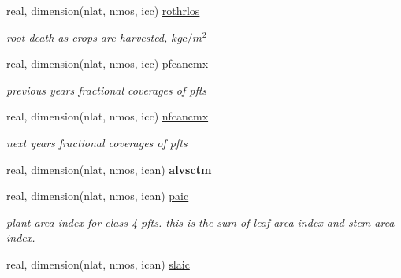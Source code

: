 \begin{DoxyCompactItemize}
\item 
\hypertarget{structctem__statevars_1_1veg__rot_a9b507da454ff945f8594997d5e55495f}{}real, dimension(nlat, nmos, icc) \hyperlink{structctem__statevars_1_1veg__rot_a9b507da454ff945f8594997d5e55495f}{rothrlos}\label{structctem__statevars_1_1veg__rot_a9b507da454ff945f8594997d5e55495f}

\begin{DoxyCompactList}\small\item\em root death as crops are harvested, $kg c/m^2$ \end{DoxyCompactList}\item 
\hypertarget{structctem__statevars_1_1veg__rot_a8f2b20847568aa585a33c3fa1631f12a}{}real, dimension(nlat, nmos, icc) \hyperlink{structctem__statevars_1_1veg__rot_a8f2b20847568aa585a33c3fa1631f12a}{pfcancmx}\label{structctem__statevars_1_1veg__rot_a8f2b20847568aa585a33c3fa1631f12a}

\begin{DoxyCompactList}\small\item\em previous year\textquotesingle{}s fractional coverages of pfts \end{DoxyCompactList}\item 
\hypertarget{structctem__statevars_1_1veg__rot_a3ab103512cda1576ebeb76a3e0d1d6d0}{}real, dimension(nlat, nmos, icc) \hyperlink{structctem__statevars_1_1veg__rot_a3ab103512cda1576ebeb76a3e0d1d6d0}{nfcancmx}\label{structctem__statevars_1_1veg__rot_a3ab103512cda1576ebeb76a3e0d1d6d0}

\begin{DoxyCompactList}\small\item\em next year\textquotesingle{}s fractional coverages of pfts \end{DoxyCompactList}\item 
\hypertarget{structctem__statevars_1_1veg__rot_a3620434a43dd413dadbc2df0ab4c1a0c}{}real, dimension(nlat, nmos, ican) {\bfseries alvsctm}\label{structctem__statevars_1_1veg__rot_a3620434a43dd413dadbc2df0ab4c1a0c}

\item 
\hypertarget{structctem__statevars_1_1veg__rot_ab8144fc5348967ab33132c88b7235069}{}real, dimension(nlat, nmos, ican) \hyperlink{structctem__statevars_1_1veg__rot_ab8144fc5348967ab33132c88b7235069}{paic}\label{structctem__statevars_1_1veg__rot_ab8144fc5348967ab33132c88b7235069}

\begin{DoxyCompactList}\small\item\em plant area index for class\textquotesingle{} 4 pfts. this is the sum of leaf area index and stem area index. \end{DoxyCompactList}\item 
\hypertarget{structctem__statevars_1_1veg__rot_a2d77c552f815b9a3794df8cd396cba03}{}real, dimension(nlat, nmos, ican) \hyperlink{structctem__statevars_1_1veg__rot_a2d77c552f815b9a3794df8cd396cba03}{slaic}\label{structctem__statevars_1_1veg__rot_a2d77c552f815b9a3794df8cd396cba03}


\end{DoxyCompactItemize}
